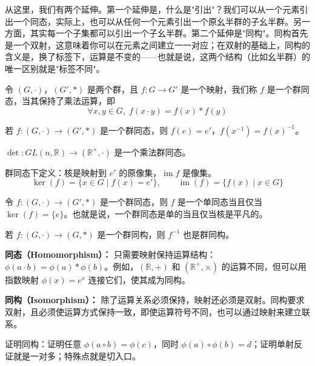 \begin{note}[同态同构的意义]
从这里，我们有两个延伸。第一个延伸是，什么是"引出"？我们可以从一个元素引出一个同态，实际上，也可以从任何一个元素引出一个原幺半群的子幺半群。另一方面，其实每一个子集都可以引出一个子幺半群。第二个延伸是"同构"。同构首先是一个双射，这意味着你可以在元素之间建立一一对应；在双射的基础上，同构的含义是，换了标签下，运算是不变的——也就是说，这两个结构（比如幺半群）的唯一区别就是"标签不同"。
\end{note}

\begin{definition}[群同态（定义 1.14）]
令 $(G,\cdot)$，$(G',*)$ 是两个群，且 $f:G\to G'$ 是一个映射，我们称 $f$ 是一个群同态，当其保持了乘法运算，即
\[
\forall x,y\in G,\;f(x\cdot y)=f(x)*f(y)
\]
\end{definition}

\begin{proposition}
若 $f:(G,\cdot)\to(G',*)$ 是一个群同态，则 $f(e)=e'$，$f(x^{-1})=f(x)^{-1}$。
\end{proposition}

\begin{proposition}
$\det:GL(n,\mathbb{R})\to(\mathbb{R}^\times,\cdot)$ 是一个乘法群同态。
\end{proposition}

\begin{definition}[核与像（定义 1.15）]
群同态下定义：核是映射到 $e'$ 的原像集，$\operatorname{im}f$ 是像集。
\[
\ker(f)=\{x\in G\mid f(x)=e'\},\qquad\operatorname{im}(f)=\{f(x)\mid x\in G\}
\]
\end{definition}

\begin{proposition}[命题 1.16]
令 $f:(G,\cdot)\to(G',*)$ 是一个群同态，则 $f$ 是一个单同态当且仅当 $\ker(f)=\{e\}$。也就是说，一个群同态是单的当且仅当核是平凡的。
\end{proposition}

\begin{proposition}[命题 1.17：同态就是拆括号的游戏]
若 $f:(G,\cdot)\to(G,*)$ 是一个群同构，则 $f^{-1}$ 也是群同构。
\end{proposition}

\begin{note}[构造同态同构的关键点]
\textbf{同态（Homomorphism）：} 只需要映射保持运算结构：$\phi(a\cdot b)=\phi(a)*\phi(b)$。例如，$(\mathbb{R},+)$ 和 $(\mathbb{R}^+,\times)$ 的运算不同，但可以用指数映射 $\phi(x)=e^x$ 连接它们，使其成为同构。

\textbf{同构（Isomorphism）：} 除了运算关系必须保持，映射还必须是双射。同构要求双射，且必须使运算方式保持一致，即使运算符号不同，也可以通过映射来建立联系。

证明同构：证明任意 $\phi(a\circ b)=\phi(c)$，同时 $\phi(a)\circ\phi(b)=d$；证明单射反证就是一对多；特殊点就是切入口。
\end{note}

